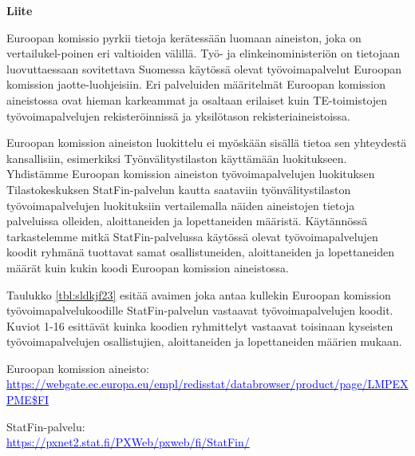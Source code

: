 \documentclass[12pt]{article}
\begin{document}
\noindent \textbf{Liite} \par


\vspace{1cm}

Euroopan komissio pyrkii tietoja kerätessään luomaan aineiston, joka on vertailukel-poinen eri valtioiden välillä. Työ- ja elinkeinoministeriön on tietojaan luovuttaessaan sovitettava Suomessa käytössä olevat työvoimapalvelut Euroopan komission jaotte-luohjeisiin. Eri palveluiden määritelmät Euroopan komission aineistossa ovat hieman karkeammat ja osaltaan erilaiset kuin TE-toimistojen työvoimapalvelujen rekisteröinnissä ja yksilötason rekisteriaineistoissa.

Euroopan komission aineiston luokittelu ei myöskään sisällä tietoa sen yhteydestä kansallisiin, esimerkiksi Työnvälitystilaston käyttämään luokitukseen. Yhdistämme Euroopan komission aineiston työvoimapalvelujen luokituksen Tilastokeskuksen StatFin-palvelun kautta saataviin työnvälitystilaston työvoimapalvelujen luokituksiin vertailemalla näiden aineistojen tietoja palveluissa olleiden, aloittaneiden ja lopettaneiden määristä. Käytännössä tarkastelemme mitkä StatFin-palvelussa käytössä olevat työvoimapalvelujen koodit ryhmänä tuottavat samat osallistuneiden, aloittaneiden ja lopettaneiden määrät kuin kukin koodi Euroopan komission aineistossa.

Taulukko \ref{tbl:sldkjf23} esitää avaimen joka antaa kullekin Euroopan komission työvoimapalvelukoodille StatFin-palvelun vastaavat työvoimapalvelujen koodit. Kuviot 1-16 esittävät kuinka koodien ryhmittelyt vastaavat toisinaan kyseisten työvoimapalvelujen osallistujien, aloittaneiden ja lopettaneiden määrien mukaan.

\vspace{1cm}
\noindent Euroopan komission aineisto: \\ \footnotesize \href{https://webgate.ec.europa.eu/empl/redisstat/databrowser/product/page/LMP_EXPME$FI}{\textcolor{blue}{https://webgate.ec.europa.eu/empl/redisstat/databrowser/product/page/LMP\textunderscore EXPME\$FI}} \normalsize

\vspace{1cm} 
\noindent StatFin-palvelu: \\ \footnotesize\href{https://pxnet2.stat.fi/PXWeb/pxweb/fi/StatFin/}{\textcolor{blue}{https://pxnet2.stat.fi/PXWeb/pxweb/fi/StatFin/}}\normalsize
\end{document}
